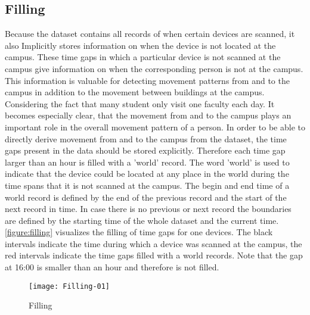 \subsection{Filling}\label{filling}
Because the dataset contains all records of when certain devices are scanned, it also Implicitly stores information on when the device is not located at the campus. These time gaps in which a particular device is not scanned at the campus give information on when the corresponding person is not at the campus. This information is valuable for detecting movement patterns from and to the campus in addition to the movement between buildings at the campus. Considering the fact that many student only visit one faculty each day. It becomes especially clear, that the movement from and to the campus plays an important role in the overall movement pattern of a person. In order to be able to directly derive movement from and to the campus from the dataset, the time gaps present in the data should be stored explicitly. Therefore each time gap larger than an hour is filled with a 'world' record. The word 'world' is used to indicate that the device could be located at any place in the world during the time spans that it is not scanned at the campus. The begin and end time of a world record is defined by the end of the previous record and the start of the next record in time. In case there is no previous or next record the boundaries are defined by the starting time of the whole dataset and the current time. \autoref{figure:filling} visualizes the filling of time gaps for one devices. The black intervals indicate the time during which a device was scanned at the campus, the red intervals indicate the time gaps filled with a world records. Note that the gap at 16:00  is smaller than an hour and therefore is not filled.
\begin{figure}[H]
\centering
\texttt{[image: Filling-01]}
\captionsetup{justification=centering}
\caption{Filling}
\label{figure:filling}
\end{figure}

